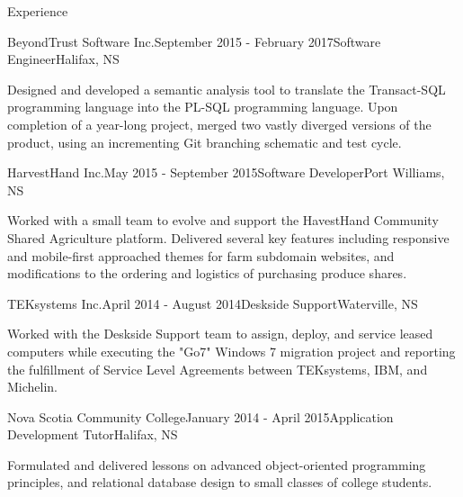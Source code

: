 \documentclass{resume} %
\begin{document}
\begin{rSection}{Experience}

\begin{rSubsection}{BeyondTrust Software Inc.}{September 2015 - February 2017}{Software Engineer}{Halifax, NS}

\item[] Designed and developed a semantic analysis tool to translate the Transact-SQL programming language into the PL-SQL programming language. Upon completion of a year-long project, merged two vastly diverged versions of the product, using an incrementing Git branching schematic and test cycle.

\end{rSubsection}



\begin{rSubsection}{HarvestHand Inc.}{May 2015 - September 2015}{Software Developer}{Port Williams, NS}

\item[] Worked with a small team to evolve and support the HavestHand Community Shared Agriculture platform. Delivered several key features including responsive and mobile-first approached themes for farm subdomain websites, and modifications to the ordering and logistics of purchasing produce shares.

\end{rSubsection}


\begin{rSubsection}{TEKsystems Inc.}{April 2014 - August 2014}{Deskside Support}{Waterville, NS}
\item[] Worked with the Deskside Support team to assign, deploy, and service leased computers while executing the "Go7" Windows 7 migration project and reporting the fulfillment of Service Level Agreements between TEKsystems, IBM, and Michelin.
\end{rSubsection}


\begin{rSubsection}{Nova Scotia Community College}{January 2014 - April 2015}{Application Development Tutor}{Halifax, NS}

\item[] Formulated and delivered lessons on advanced object-oriented programming principles, and relational database design to small classes of college students.
\end{rSubsection}


\end{rSection}
\end{document}
